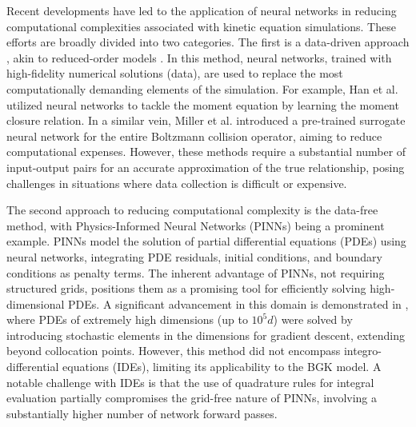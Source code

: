 \documentclass[preprint,12pt]{elsarticle}
\begin{document}
Recent developments have led to the application of neural networks in reducing computational complexities associated with kinetic equation simulations.
These efforts are broadly divided into two categories.
The first is a data-driven approach \cite{porteous2021data, alekseenko2022fast, xiao2023relaxnet}, akin to reduced-order models \cite{tsai2023accelerating}.
In this method, neural networks, trained with high-fidelity numerical solutions (data), are used to replace the most computationally demanding elements of the simulation.
For example, Han et al. \cite{han2019uniformly} utilized neural networks to tackle the moment equation by learning the moment closure relation.
In a similar vein, Miller et al. \cite{miller2022neural} introduced a pre-trained surrogate neural network for the entire Boltzmann collision operator, aiming to reduce computational expenses.
However, these methods require a substantial number of input-output pairs for an accurate approximation of the true relationship, posing challenges in situations where data collection is difficult or expensive.


The second approach to reducing computational complexity is the data-free method, with Physics-Informed Neural Networks (PINNs) \cite{raissi2019physics, lu2021physics, lee2023oppinn, muller2023achieving, wang2023expert, zhou2023physics} being a prominent example.
PINNs model the solution of partial differential equations (PDEs) using neural networks, integrating PDE residuals, initial conditions, and boundary conditions as penalty terms.
The inherent advantage of PINNs, not requiring structured grids, positions them as a promising tool for efficiently solving high-dimensional PDEs. 
A significant advancement in this domain is demonstrated in \cite{hu2023tackling, hu2023hutchinson}, where PDEs of extremely high dimensions (up to $10^5 d$) were solved by introducing stochastic elements in the dimensions for gradient descent, extending beyond collocation points.
However, this method did not encompass integro-differential equations (IDEs), limiting its applicability to the BGK model.
A notable challenge with IDEs is that the use of quadrature rules for integral evaluation partially compromises the grid-free nature of PINNs, involving a substantially higher number of network forward passes. 
\end{document}
